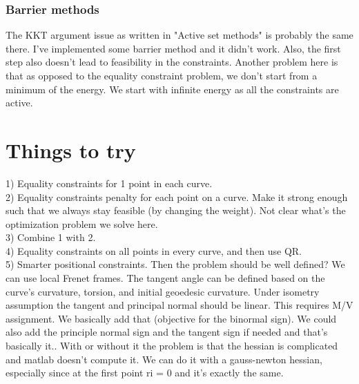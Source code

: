 \documentclass{article}
\theoremstyle{definition}
\begin{document}
\subsubsection{Barrier methods}
The KKT argument issue as written in "Active set methods" is probably the same there. I've implemented some barrier method and it didn't work. Also, the first step also doesn't lead to feasibility in the constraints. Another problem here is that as opposed to the equality constraint problem, we don't start from a minimum of the energy. We start with infinite energy as all the constraints are active.

\section{Things to try}
1) Equality constraints for 1 point in each curve.\\
2) Equality constraints penalty for each point on a curve. Make it strong enough such that we always stay feasible (by changing the weight). Not clear what's the optimization problem we solve here. \\
3) Combine 1 with 2. \\
4) Equality constraints on all points in every curve, and then use QR. \\
5) Smarter positional constraints. Then the problem should be well defined? We can use local Frenet frames. The tangent angle can be defined based on the curve's curvature, torsion, and initial geoedesic curvature. Under isometry assumption the tangent and principal normal should be linear. This requires M/V assignment. We basically add that (objective for the binormal sign). We could also add the principle normal sign and the tangent sign if needed and that's basically it.. With or without it the problem is that the hessian is complicated and matlab doesn't compute it. We can do it with a gauss-newton hessian, especially since at the first point ri = 0 and it's exactly the same.


%
%
\end{document}
